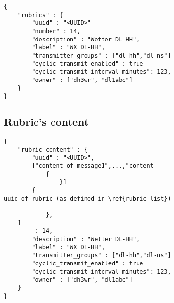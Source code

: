 \documentclass[a4paper]{article}
\begin{document}
\begin{lstlisting}
{
    "rubrics" : {
    	"uuid" : "<UUID>"
        "number" : 14,
        "description" : "Wetter DL-HH",
        "label" : "WX DL-HH",
        "transmitter_groups" : ["dl-hh","dl-ns"]
    	"cyclic_transmit_enabled" : true
        "cyclic_transmit_interval_minutes": 123,
    	"owner" : ["dh3wr", "dl1abc"]
    }
}
\end{lstlisting}

\subsection{Rubric's content}

\begin{lstlisting}
{
    "rubric_content" : {
		"uuid" : "<UUID>",
		["content_of_message1",...,"content
        	{
            	}]
    	{
uuid of rubric (as defined in \ref{rubric_list})
            
            },
    ]
         : 14,
        "description" : "Wetter DL-HH",
        "label" : "WX DL-HH",
        "transmitter_groups" : ["dl-hh","dl-ns"]
    	"cyclic_transmit_enabled" : true
        "cyclic_transmit_interval_minutes": 123,
    	"owner" : ["dh3wr", "dl1abc"]
    }
}
\end{lstlisting}
\end{document}

